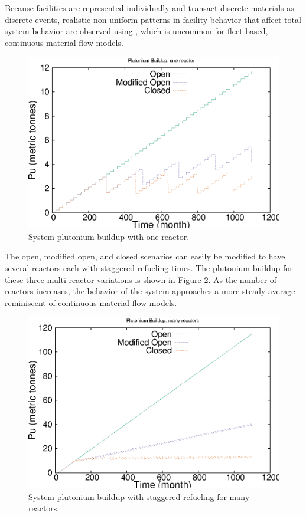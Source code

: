 Because facilities are represented individually and
transact discrete materials as discrete events, realistic non-uniform patterns in facility behavior
that affect total system behavior are observed using \Cyclus, which is uncommon 
for fleet-based, continuous material flow models.

\begin{figure}[H]
\label{fig:puseries1}
\caption{System plutonium buildup with one reactor.}
\begin{center}
\includegraphics{./images/puseries-1.eps}
\end{center}
\end{figure}

The open, modified open, and closed scenarios can easily be modified to have
several reactors each with staggered refueling times. The plutonium buildup
for these three multi-reactor variations is shown in Figure
\ref{fig:puseriesn}. As the number of
reactors increases, the behavior of the system approaches a more steady
average reminiscent of continuous material flow models. 

\begin{figure}[H]
\label{fig:puseriesn}
\caption{System plutonium buildup with staggered refueling for many reactors.}
\begin{center}
\includegraphics{./images/puseries-n.eps}
\end{center}
\end{figure}

